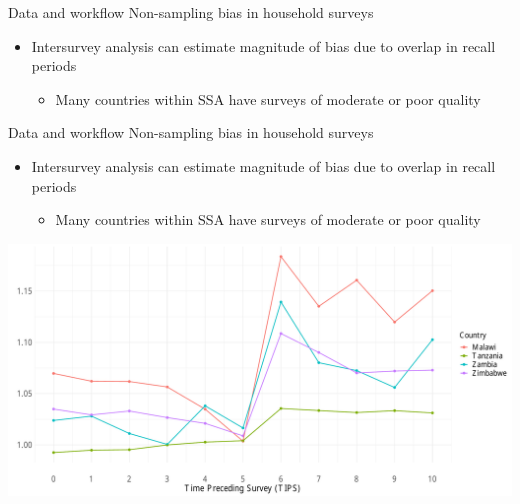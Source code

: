\documentclass[ignorenonframetext,]{beamer}
\providecommand{\tightlist}{%
  \setlength{\itemsep}{0pt}\setlength{\parskip}{0pt}}
\begin{document}
\begin{frame}[t]{Data and workflow \textbar{} Non-sampling bias in
household surveys}
\protect\hypertarget{data-and-workflow-non-sampling-bias-in-household-surveys-2}{}

\begin{itemize}
\tightlist
\item
  Intersurvey analysis can estimate magnitude of bias due to overlap in
  recall periods

  \begin{itemize}
  \tightlist
  \item
    Many countries within SSA have surveys of moderate or poor quality
  \end{itemize}
\end{itemize}

\end{frame}

\begin{frame}[t]{Data and workflow \textbar{} Non-sampling bias in
household surveys}
\protect\hypertarget{data-and-workflow-non-sampling-bias-in-household-surveys-3}{}

\begin{itemize}
\tightlist
\item
  Intersurvey analysis can estimate magnitude of bias due to overlap in
  recall periods

  \begin{itemize}
  \tightlist
  \item
    Many countries within SSA have surveys of moderate or poor quality
  \end{itemize}
\end{itemize}

\begin{center}\includegraphics[height=0.5\textheight]{2020_04_UNPD_files/figure-beamer/unnamed-chunk-4-1} \end{center}

\end{frame}
\end{document}
